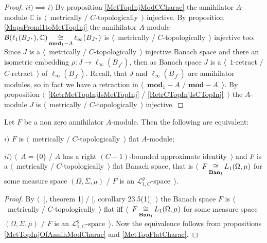 \begin{proof}
$ii)$$\implies$$ i)$ By proposition \ref{MetTopInjModCCharac} the annihilator $A$-module $\mathbb{C}$ is $\langle$~metrically / $C$-topologically~$\rangle$ injective. By proposition \ref{MapsFroml1toMetTopInj} the annihilator $A$-module $\mathcal{B}(\ell_1(B_{J^*}),\mathbb{C})\mathop{\mathbin{\cong}}\limits_{\mathbf{mod}_1-A}\ell_\infty(B_{J^*})$ is $\langle$~metrically / $C$-topologically~$\rangle$ injective too. Since $J$ is a $\langle$~metrically / $C$-topologically~$\rangle$ injective Banach space and there an isometric embedding $\rho:J\to \ell_\infty(B_{J^*})$, then as Banach space $J$ is a $\langle$~$1$-retract / $C$-retract~$\rangle$ of $\ell_\infty(B_{J^*})$. Recall, that $J$ and $\ell_\infty(B_{J^*})$ are annihilator modules, so in fact we have a retraction in $\langle$~$\mathbf{mod}_1-A$ / $\mathbf{mod}-A$~$\rangle$. By proposition $\langle$~\ref{RetrMetTopInjIsMetTopInj} / \ref{RetrCTopInjIsCTopInj}~$\rangle$ the $A$-module $J$ is $\langle$~metrically / $C$-topologically~$\rangle$ injective.
\end{proof}

\begin{proposition}\label{MetTopFlatAnnihModCharac} Let $F$ be a non zero annihilator $A$-module. Then the following are equivalent:

$i)$ $F$ is $\langle$~metrically / $C$-topologically~$\rangle$ flat $A$-module;

$ii)$ $\langle$~$A=\{0\}$ / $A$ has a right $(C-1)$-bounded approximate identity~$\rangle$ and $F$ is a $\langle$~metrically / $C$-topologically~$\rangle$ flat Banach space, that is $\langle$~$F\mathop{\mathbin{\cong}}\limits_{\mathbf{Ban}_1}L_1(\Omega,\mu)$ for some measure space $(\Omega, \Sigma, \mu)$ / $F$ is an $\mathscr{L}_{1,C}^g$-space~$\rangle$.
\end{proposition}
\begin{proof} By $\langle$~[\cite{GrothMetrProjFlatBanSp}, theorem 1] / [\cite{DefFloTensNorOpId}, corollary 23.5(1)]~$\rangle$ the Banach space $F$ is $\langle$~metrically / $C$-topologically~$\rangle$ flat iff $\langle$~$F\mathop{\mathbin{\cong}}\limits_{\mathbf{Ban}_1}L_1(\Omega,\mu)$ for some measure space $(\Omega, \Sigma, \mu)$ / $F$ is an $\mathscr{L}_{1,C}^g$-space~$\rangle$. Now the equivalence follows from propositions \ref{MetTopInjOfAnnihModCharac} and \ref{MetTopFlatCharac}.
\end{proof}

